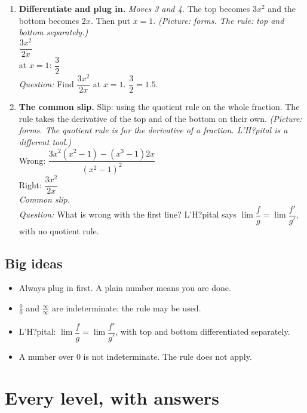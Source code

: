 \documentclass[11pt]{article}
\begin{document}
\begin{enumerate}
\item \textbf{Differentiate and plug in.} \textit{Moves 3 and 4.} The top becomes $3x^2$ and the bottom becomes $2x$. Then put $x=1$. \textit{(Picture: forms. The rule: top and bottom separately.)}\\ $\dfrac{3x^2}{2x}$\\ at $x=1$: $\dfrac32$\\ \textit{Question:} Find $\dfrac{3x^2}{2x}$ at $x=1$.  $\dfrac{3}{2}=1.5$.
\item \textbf{The common slip.} Slip: using the quotient rule on the whole fraction. The rule takes the derivative of the top and of the bottom on their own. \textit{(Picture: forms. The quotient rule is for the derivative of a fraction. L'H?pital is a different tool.)}\\ Wrong: $\dfrac{3x^2(x^2-1)-(x^3-1)2x}{(x^2-1)^2}$\\ Right: $\dfrac{3x^2}{2x}$\\ \textit{Common slip.}\\ \textit{Question:} What is wrong with the first line?  L'H?pital says $\lim\dfrac fg=\lim\dfrac{f'}{g'}$, with no quotient rule.
\end{enumerate}
\subsection*{Big ideas}\begin{itemize}\item Always plug in first. A plain number means you are done.
\item $\frac00$ and $\frac{\infty}{\infty}$ are indeterminate: the rule may be used.
\item L'H?pital: $\lim\dfrac fg=\lim\dfrac{f'}{g'}$, with top and bottom differentiated separately.
\item A number over 0 is not indeterminate. The rule does not apply.\end{itemize}
\section*{Every level, with answers}
\end{document}
